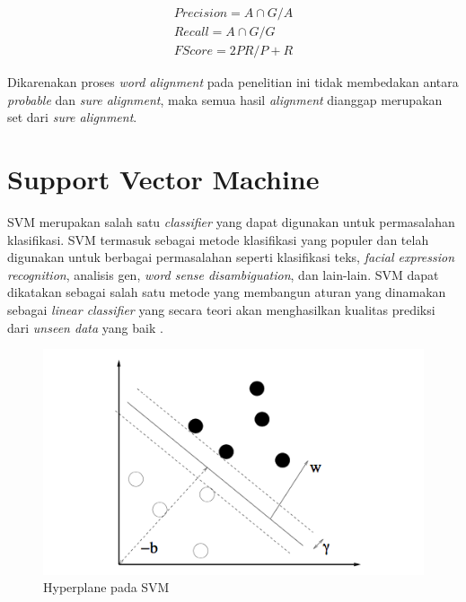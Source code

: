 \begin{equation}
	\begin{split}
	Precision = A \cap G / A \\
	Recall = A \cap G / G \\
	FScore = 2 P R / P + R
	\end{split}
\end{equation}

Dikarenakan proses \textit{word alignment} pada penelitian ini tidak membedakan antara \textit{probable} dan \textit{sure alignment}, maka semua hasil \textit{alignment} dianggap merupakan set dari \textit{sure alignment}.

\section{Support Vector Machine}
SVM merupakan salah satu \textit{classifier} yang dapat digunakan untuk permasalahan klasifikasi. SVM termasuk sebagai metode klasifikasi yang populer dan telah digunakan untuk berbagai permasalahan seperti klasifikasi teks, \textit{facial expression recognition}, analisis gen, \textit{word sense disambiguation}, dan lain-lain. SVM dapat dikatakan sebagai salah satu metode yang membangun aturan yang dinamakan sebagai \textit{linear classifier} yang secara teori akan menghasilkan kualitas prediksi dari \textit{unseen data} yang baik \citep{fradkin2006support}.

\begin{figure}
	\centering
	\includegraphics[width=1\linewidth]{adit_pics/svm-hyperplane}
	\caption{Hyperplane pada SVM \citep{fradkin2006support}}
	\label{fig:svm}
\end{figure}

